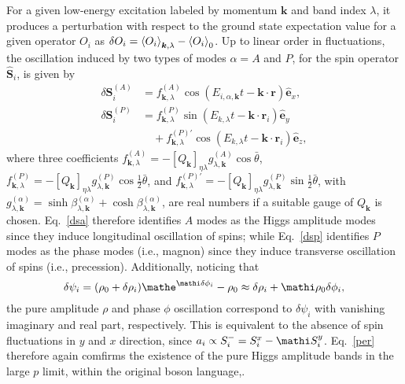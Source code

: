 For a given low-energy excitation labeled by momentum $\bm{k}$ and band index $\lambda$,
it produces a perturbation with respect to the ground state expectation value for a given operator $O_i$ as $\delta O_i = \expval{O_i}_{\bm k,\lambda}-\expval{O_i}_0$.
Up to linear order in fluctuations,
the oscillation induced by two types of modes $\alpha = A$ and $P$,
for the spin operator $\hat{\bm{S}}_i$,
is given by
\begin{subequations}\label{per}
    \begin{align}
        \delta \bm{S}_i^{(A)} &= f^{(A)}_{\bm{k}, \lambda} \cos (E_{i, \alpha,
  \bm{k}} t -\bm{k} \cdot \bm{r}) \hat{\bm{e}}_x,
  \label{dsa}\\
   \delta \bm{S}_i^{(P)} &= f^{(P)}_{ \bm{k}, \lambda} \sin (E_{k,
  \lambda} t -\bm{k} \cdot \bm{r}_i) \hat{\bm{e}}_y \nonumber\\
 &\quad + f^{(P)\prime}_{\bm{k}, \lambda} \cos (E_{k, \lambda} t -\bm{k} \cdot
  \bm{r}_i) \hat{\bm{e}}_z, \label{dsp}
    \end{align}
\end{subequations}
where three coefficients $f^{(A)}_{\bm{k}, \lambda} = - [Q_{\bm{k}}]_{\eta \lambda} g^{(A)}_{\lambda, \bm{k}} \cos \bar{\theta}$,
$f^{(P)}_{\bm{k}, \lambda}= - [Q_{\bm{k}}]_{\eta \lambda} g^{(P)}_{\lambda, \bm{k}} \cos\frac{1}{2}\bar{\theta}$,
and $f^{(P)\prime}_{\bm{k}, \lambda} = -[Q_{\bm{k}}]_{\eta \lambda} g^{(P)}_{\lambda, \bm{k}} \sin\frac{1}{2}\bar{\theta}$, with $g^{(\alpha)}_{\lambda, \bm{k}} = \sinh\beta^{(\alpha)}_{\lambda, \bm{k}} + \cosh \beta^{(\alpha)}_{\lambda,
\bm{k}}$, are real numbers if a suitable gauge of $Q_{\bm{k}}$ is chosen.
Eq.~\eqref{dsa} therefore identifies $A$ modes as the Higgs amplitude modes since they induce longitudinal oscillation of spins;
while Eq.~\eqref{dsp} identifies $P$ modes as the phase modes (i.e., magnon) since they induce transverse oscillation of spins (i.e., precession).
Additionally, noticing that
\begin{equation}
  \delta\psi_i = (\rho_0 + \delta \rho_i) \mathe^{\mathi \delta \phi_i} - \rho_0
  \approx \delta \rho_i + \mathi \rho_0 \delta \phi_i, \label{op}
\end{equation}
the pure amplitude $\rho$ and phase $\phi$ oscillation correspond to $\delta \psi_i$ with vanishing imaginary and real part, respectively.
This is equivalent to the absence of spin fluctuations in $y$ and $x$ direction, since $a_i \propto S_i^- = S_i^x - \mathi S_i^y$.
Eq.~\eqref{per} therefore again comfirms the existence of the pure Higgs amplitude bands in the large $p$ limit, within the original boson language,.

